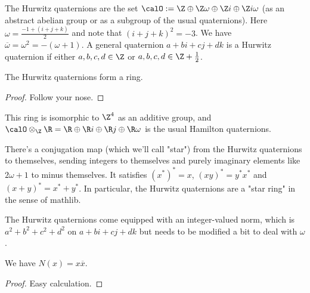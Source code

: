 \begin{definition}
    \label{Hurwitz}
    \leanok
        The Hurwitz quaternions are the set $\calO := \Z\oplus\Z \omega\oplus\Z i\oplus
    \Z i\omega$ (as an abstract abelian group or as a subgroup of the usual quaternions).
    Here $\omega=\frac{-1+(i+j+k)}{2}$ and note that $(i+j+k)^2=-3$.
    We have $\overline{\omega}=\omega^2=-(\omega+1)$. A general quaternion
    $a+bi+cj+dk$ is a Hurwitz quaternion if either $a,b,c,d\in\Z$
    or $a,b,c,d\in\Z+\frac{1}{2}$.
\end{definition}

\begin{lemma}
    \label{Hurwitz.ring}
    \leanok
    The Hurwitz quaternions form a ring.
\end{lemma}
\begin{proof}
    \leanok
    Follow your nose.
\end{proof}


This ring is isomorphic to $\Z^4$ as an additive group, and
$\calO\otimes_{\Z}\R=\R\oplus \R i\oplus \R j\oplus\R \omega$
is the usual Hamilton quaternions.

\begin{definition}
    \label{Hurwitz.starRing}
    \leanok
    There's a conjugation map (which we'll call "star") from the Hurwitz quaternions to themselves, sending
    integers to themselves and purely imaginary elements like $2\omega+1$ to minus themselves.
    It satisfies $(x^*)^*=x$, $(xy)^*=y^*x^*$ and $(x+y)^*=x^*+y^*$. In particular, the Hurwitz
    quaternions are a "star ring" in the sense of mathlib.
\end{definition}

\begin{definition}
    \label{Hurwitz.norm}
    \leanok
    The Hurwitz quaternions come equipped with an integer-valued norm, which is
    $a^2+b^2+c^2+d^2$ on $a+bi+cj+dk$ but needs to be modified a bit to deal with $\omega$.
\end{definition}

\begin{lemma}
    \label{Hurwitz.norm_eq_mul_conj}
    \leanok
    We have $N(x)=x\overline{x}$.
\end{lemma}
\begin{proof}
    \leanok
    Easy calculation.
\end{proof}

